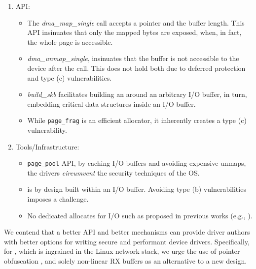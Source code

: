 \begin{enumerate}
    \item API: 
    \begin{itemize}[wide, labelwidth=!, labelindent=0pt]
        \item The \textit{dma\_map\_single} call accepts a pointer and the buffer length. This API insinuates that only the mapped bytes are exposed, when, in fact, the whole page is accessible.
        \item \textit{dma\_unmap\_single}, insinuates that the buffer is not accessible to the device after the call. This does not hold both due to deferred protection and type (c) \subpage{} vulnerabilities.
        \item \textit{build\_skb} facilitates building an \skb{} around an arbitrary I/O buffer, in turn, embedding critical data structures inside an I/O buffer.
        \item While \texttt{page\_frag} is an efficient allocator, it inherently creates a type (c) \subpage{} vulnerability.
    \end{itemize} 
    \item Tools/Infrastructure: 
    \begin{itemize}[wide, labelwidth=!, labelindent=0pt]
            \item \texttt{page\_pool} API, by caching I/O buffers and avoiding expensive unmaps, the drivers \emph{circumvent} the security techniques of the OS. 
            \item \shinfo{} is by design built within an I/O buffer. Avoiding type (b) \subpage{} vulnerabilities imposes a challenge.
            \item No dedicated allocates for I/O such as proposed in previous works (e.g., \cite{MSMT18,MMT16}).
    \end{itemize}
\end{enumerate}

We contend that a better API and better mechanisms can provide driver authors with better options for writing secure and performant device drivers. Specifically, for \shinfo{}, which is ingrained in the Linux network stack, we urge the use of pointer obfuscation \cite{Coo17}, and solely non-linear RX buffers as an alternative to a new design. 

